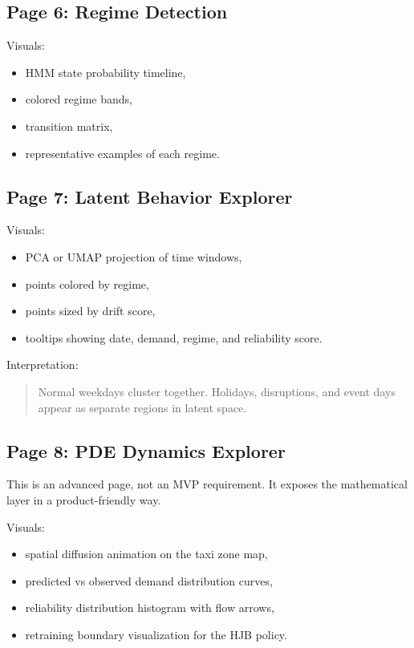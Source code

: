 \documentclass[11pt]{article}
\begin{document}
\subsection{Page 6: Regime Detection}

Visuals:

\begin{itemize}
    \item HMM state probability timeline,
    \item colored regime bands,
    \item transition matrix,
    \item representative examples of each regime.
\end{itemize}

\subsection{Page 7: Latent Behavior Explorer}

Visuals:

\begin{itemize}
    \item PCA or UMAP projection of time windows,
    \item points colored by regime,
    \item points sized by drift score,
    \item tooltips showing date, demand, regime, and reliability score.
\end{itemize}

Interpretation:

\begin{quote}
    Normal weekdays cluster together. Holidays, disruptions, and event days appear as separate regions in latent space.
\end{quote}

\subsection{Page 8: PDE Dynamics Explorer}

This is an advanced page, not an MVP requirement. It exposes the mathematical layer in a product-friendly way.

Visuals:

\begin{itemize}
    \item spatial diffusion animation on the taxi zone map,
    \item predicted vs observed demand distribution curves,
    \item reliability distribution histogram with flow arrows,
    \item retraining boundary visualization for the HJB policy.
\end{itemize}
\end{document}
